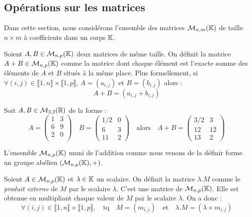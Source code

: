 \subsection{Opérations sur les matrices}

Dans cette section, nous considérons l'ensemble des matrices $ \mathcal{M}_{n,m}(\mathbb{K})$ de taille $ n \times m $
à coefficients dans un corps $\mathbb{K}$. 

\begin{definition}
    Soient $A,B \in \mathcal{M}_{n,p}(\mathbb{K})$ deux matrices de même taille. 
    On définit la matrice $A + B \in \mathcal{M}_{n,p}(\mathbb{K})$ comme la matrice dont chaque élément est 
    l'exacte somme des éléments de $A$ et $B$ situés à la même place. 
    Plus formellement, si $ \forall (i,j) \in \llbracket 1, n \rrbracket \times  \llbracket 1, p \rrbracket$, 
    $ A = (a_{i,j})$ et $ B = (b_{i,j})$ alors : 
        \[ A + B = (a_{i,j} + b_{i,j}) \]
\end{definition}

\begin{example}
    Soit $A,B \in \mathcal{M}_{3,2}(\mathbb{R})$ de la forme : 
        \[ A = 
            \begin{pmatrix}
                1 & 3 \\ 
                6 & 9 \\ 
                2 & 0 \\ 
            \end{pmatrix}
            \quad B = 
            \begin{pmatrix}
                1/2 & 0 \\ 
                6 & 3 \\ 
                11 & 2
            \end{pmatrix}
            \quad \text{alors} \quad A + B = 
            \begin{pmatrix}
                3/2 & 3 \\ 
                12 & 12 \\ 
                13 & 2 
            \end{pmatrix} \] 
\end{example}

L'ensemble $ \mathcal{M}_{n,p}(\mathbb{K})$ muni de l'addition comme nous venons de la définir forme un groupe abélien 
$(\mathcal{M}_{n,p}(\mathbb{K}), +)$. 

\begin{definition}
    Soient $A \in \mathcal{M}_{n,p}(\mathbb{K})$ et $ \lambda \in \mathbb{K}$ un scalaire. 
    On définit la matrice $\lambda . M$ comme le \emph{produit externe} de $M$ par le scalaire $\lambda$. 
    C'est une matrice de $\mathcal{M}_{n,p}(\mathbb{K})$. 
    Elle est obtenue en multipliant chaque valeur de $M$ par le scalaire $\lambda$. 
    On a donc : 
        \[ \forall (i,j) \in \llbracket 1, n \rrbracket \times  \llbracket 1, p \rrbracket, \quad \text{tq} \quad M = (m_{i,j}) \quad \text{et} \quad \lambda.M = (\lambda \times m_{i,j}) \] 
\end{definition}

